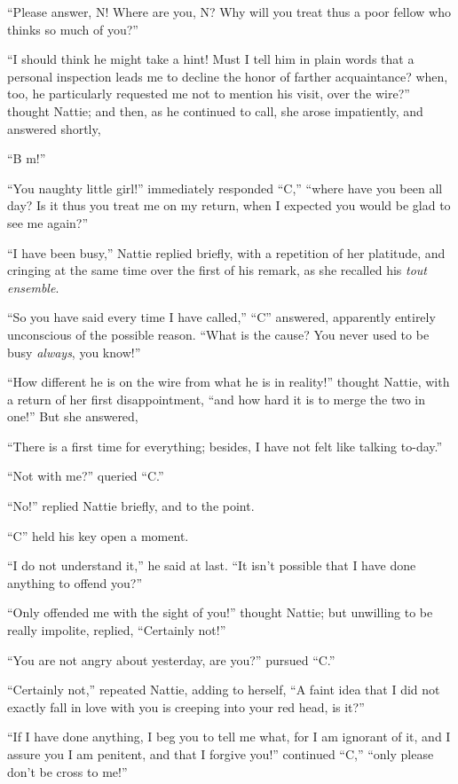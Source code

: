 ``Please answer, N! Where are you, N? Why will you treat thus a poor
fellow who thinks so much of you?''

``I should think he might take a hint! Must I tell him in plain words
that a personal inspection leads me to decline the honor of farther
acquaintance? when, too, he particularly requested me not to mention his
visit, over the wire?'' thought Nattie; and then, as he continued to
call, she arose impatiently, and answered shortly,

``B m!''

``You naughty little girl!'' immediately responded ``C,'' ``where have you
been all day? Is it thus you treat me on my return, when I expected you
would be glad to see me again?''

``I have been busy,'' Nattie replied briefly, with a repetition of her
platitude, and cringing at the same time over the first of his remark,
as she recalled his \emph{tout ensemble}.

``So you have said every time I have called,'' ``C'' answered, apparently
entirely unconscious of the possible reason. ``What is the cause? You
never used to be busy \emph{always}, you know!''

``How different he is on the wire from what he is in reality!'' thought
Nattie, with a return of her first disappointment, ``and how hard it is
to merge the two in one!'' But she answered,

``There is a first time for everything; besides, I have not felt like
talking to-day.''

``Not with me?'' queried ``C.''

``No!'' replied Nattie briefly, and to the point.

``C'' held his key open a moment.

``I do not understand it,'' he said at last. ``It isn't possible that I
have done anything to offend you?''

``Only offended me with the sight of you!'' thought Nattie; but unwilling
to be really impolite, replied, ``Certainly not!''

``You are not angry about yesterday, are you?'' pursued ``C.''

``Certainly not,'' repeated Nattie, adding to herself, ``A faint idea that
I did not exactly fall in love with you is creeping into your red head,
is it?''

``If I have done anything, I beg you to tell me what, for I am ignorant
of it, and I assure you I am penitent, and that I forgive you!''
continued ``C,'' ``only please don't be cross to me!''

